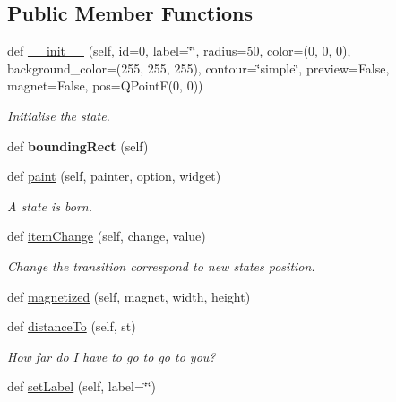 \subsection*{Public Member Functions}
\begin{DoxyCompactItemize}
\item 
def \mbox{\hyperlink{classState_1_1State_a06a27f926cc7be3f16e259415c34d533}{\+\_\+\+\_\+init\+\_\+\+\_\+}} (self, id=0, label=\char`\"{}\char`\"{}, radius=50, color=(0, 0, 0), background\+\_\+color=(255, 255, 255), contour=\char`\"{}simple\char`\"{}, preview=False, magnet=False, pos=Q\+PointF(0, 0))
\begin{DoxyCompactList}\small\item\em Initialise the state. \end{DoxyCompactList}\item 
\mbox{\label{classState_1_1State_aad307e33d63cc6b7df1bfc281ac414b0}} 
def {\bfseries bounding\+Rect} (self)
\item 
def \mbox{\hyperlink{classState_1_1State_af8a2d01341055bd8d0e56f5a45b81bb7}{paint}} (self, painter, option, widget)
\begin{DoxyCompactList}\small\item\em A state is born. \end{DoxyCompactList}\item 
\mbox{\label{classState_1_1State_a5923474787e9b253f6c1c31552839503}} 
def \mbox{\hyperlink{classState_1_1State_a5923474787e9b253f6c1c31552839503}{item\+Change}} (self, change, value)
\begin{DoxyCompactList}\small\item\em Change the transition correspond to new state\textquotesingle{}s position. \end{DoxyCompactList}\item 
def \mbox{\hyperlink{classState_1_1State_af8dae223eec1344656a82451fb7fdd98}{magnetized}} (self, magnet, width, height)
\item 
def \mbox{\hyperlink{classState_1_1State_a3fb5fb5e2fb8c14daedb424be4d867b3}{distance\+To}} (self, st)
\begin{DoxyCompactList}\small\item\em How far do I have to go to go to you? \end{DoxyCompactList}\item 
def \mbox{\hyperlink{classState_1_1State_a4cf3c389c5240bf94c31ea95567c8ccd}{set\+Label}} (self, label=\char`\"{}\char`\"{})

\end{DoxyCompactItemize}
